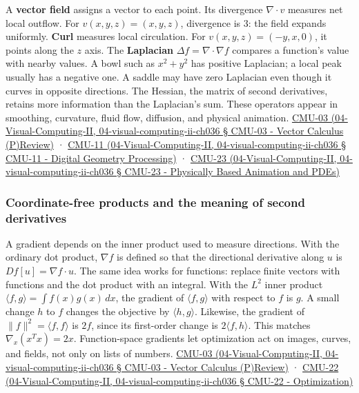 A \textbf{vector field} assigns a vector to each point. Its divergence \(\nabla\cdot v\) measures net local outflow. For \(v(x,y,z)=(x,y,z)\), divergence is 3: the field expands uniformly. \textbf{Curl} measures local circulation. For \(v(x,y,z)=(-y,x,0)\), it points along the \(z\) axis. The \textbf{Laplacian} \(\Delta f=\nabla\cdot\nabla f\) compares a function's value with nearby values. A bowl such as \(x^2+y^2\) has positive Laplacian; a local peak usually has a negative one. A saddle may have zero Laplacian even though it curves in opposite directions. The Hessian, the matrix of second derivatives, retains more information than the Laplacian's sum. These operators appear in smoothing, curvature, fluid flow, diffusion, and physical animation. \href{}{CMU-03 (04-Visual-Computing-II, 04-visual-computing-ii-ch036 § CMU-03 - Vector Calculus (P)Review)} · \href{}{CMU-11 (04-Visual-Computing-II, 04-visual-computing-ii-ch036 § CMU-11 - Digital Geometry Processing)} · \href{}{CMU-23 (04-Visual-Computing-II, 04-visual-computing-ii-ch036 § CMU-23 - Physically Based Animation and PDEs)}

\subsubsection{Coordinate-free products and the meaning of second derivatives}\label{coordinate-free-products-and-the-meaning-of-second-derivatives}

A gradient depends on the inner product used to measure directions. With the ordinary dot product, \(\nabla f\) is defined so that the directional derivative along \(u\) is \(Df[u]=\nabla f\cdot u\). The same idea works for functions: replace finite vectors with functions and the dot product with an integral. With the \(L^2\) inner product \(\langle f,g\rangle=\int f(x)g(x)\,dx\), the gradient of \(\langle f,g\rangle\) with respect to \(f\) is \(g\). A small change \(h\) to \(f\) changes the objective by \(\langle h,g\rangle\). Likewise, the gradient of \(\|f\|^2=\langle f,f\rangle\) is \(2f\), since its first-order change is \(2\langle f,h\rangle\). This matches \(\nabla_x(x^Tx)=2x\). Function-space gradients let optimization act on images, curves, and fields, not only on lists of numbers. \href{}{CMU-03 (04-Visual-Computing-II, 04-visual-computing-ii-ch036 § CMU-03 - Vector Calculus (P)Review)} · \href{}{CMU-22 (04-Visual-Computing-II, 04-visual-computing-ii-ch036 § CMU-22 - Optimization)}

